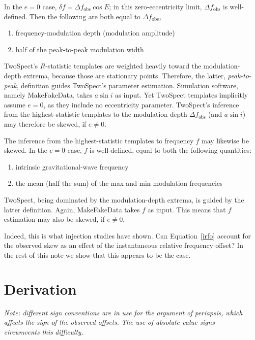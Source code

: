 \documentclass{article}
\begin{document}
In the $e = 0$ case, $\delta f = \Delta f_\mathrm{obs} \cos E$; in this zero-eccentricity limit, $\Delta f_\mathrm{obs}$ is well-defined. 
Then the following are both equal to $\Delta f_\mathrm{obs}$,

\begin{enumerate}
\item frequency-modulation depth (modulation amplitude)
\item half of the peak-to-peak modulation width 
\end{enumerate}

TwoSpect's $R$-statistic templates are weighted heavily toward the modulation-depth extrema, because those are stationary points.
Therefore, the latter, \textit{peak-to-peak}, definition guides TwoSpect's parameter estimation.
Simulation software, namely MakeFakeData, takes $a \sin i$ as input.
Yet TwoSpect templates implicitly assume $e=0$, as they include no eccentricity parameter.
TwoSpect's inference from the highest-statistic templates to the modulation depth $\Delta f_\mathrm{obs}$ (and $a \sin i$) may therefore be skewed, if $e \neq 0$. 
 
The inference from the highest-statistic templates to frequency $f$ may likewise be skewed.
In the $e=0$ case, $f$ is well-defined, equal to both the following quantities:

\begin{enumerate}
\item intrinsic gravitational-wave frequency
\item the mean (half the sum) of the max and min modulation frequencies
\end{enumerate}

TwoSpect, being dominated by the modulation-depth extrema, is guided by the latter definition.
Again, MakeFakeData takes $f$ as input.
This means that $f$ estimation may also be skewed, if $e \neq 0$.

Indeed, this is what injection studies have shown. 
Can Equation~\ref{irfo} account for the observed skew as an effect of the instantaneous relative frequency offset?
In the rest of this note we show that this appears to be the case.

\section{Derivation}

\textit{Note: different sign conventions are in use for the argument of periapsis, which affects the sign of the observed offsets. The use of absolute value signs circumvents this difficulty.}
\end{document}
